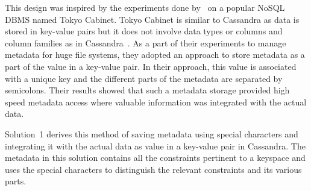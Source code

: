 
This design was inspired by the experiments done by~\citet{Hackl} on a popular
\ac{NoSQL} \ac{DBMS} named Tokyo Cabinet.  Tokyo Cabinet is similar to Cassandra
as data is stored in key-value pairs but it does not involve data types or
columns and column families as in Cassandra~\citep{Hackl,tokyo}.
As a part of their experiments to manage metadata for huge file systems,  they
adopted an approach to store metadata  as a part of the value in a key-value
pair.  In their approach, this value  is associated with a
unique key and the different parts of the metadata are separated by semicolons.
Their results showed that such a metadata storage provided high speed metadata
access where valuable information was integrated with the actual data.

Solution~1 derives this method of saving
metadata using special characters and integrating it with the actual data as
value in a key-value pair in Cassandra.  The metadata in this solution 
contains all the constraints pertinent to a keyspace and uses
the special characters to distinguish the relevant constraints and its various
parts.

\vfill










